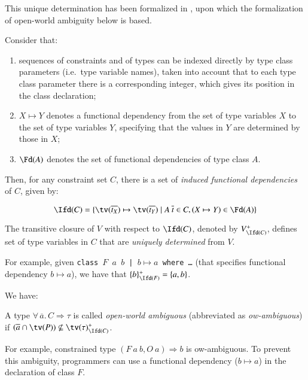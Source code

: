 \documentclass[review]{elsarticle}
\begin{document}
This unique determination has been formalized in
\cite{Type-classes-with-FDs-MarkJones00,MarkJonesIatchki2008-FDs},
upon which the formalization of open-world ambiguity below is based.

Consider that:

  \begin{enumerate}

    \item sequences of constraints and of types can be indexed
      directly by type class parameters (i.e.~type variable names),
      taken into account that to each type class parameter there is a
      corresponding integer, which gives its position in the class
      declaration;

    \item $X \mapsto Y$ denotes a functional dependency from the set
      of type variables $X$ to the set of type variables $Y$,
      specifying that the values in $Y$ are determined by those in
      $X$;

    \item $\Fd(A)$ denotes the set of functional dependencies of type
      class $A$.

  \end{enumerate}

Then, for any constraint set $C$, there is a set of {\em induced
  functional dependencies\/} of $C$, given by:

  \[ \Ifd(C) = \{ \tv(\overline{t_X}) \mapsto \tv(\overline{t_Y})
                  \mid A\:\overline{t} \in C, (X\mapsto Y) \in \Fd(A) \}
          \]

The transitive closure of $V$ with respect to $\Ifd(C)$, denoted by
$V_{\Ifd(C)}^+$, defines set of type variables in $C$ that are {\em
  uniquely determined\/} from $V$.

For example, given {\tt class $F$ $a$ $b$ | $b \mapsto a$ where
  \ldots} (that specifies functional dependency ${b} \mapsto {a}$),
we have that $\{ b \}_{\Ifd(F)}^+ = \{ a, b \}$.

We have:

\begin{Definition}
A type $\forall\,\overline{a}.\,C \Rightarrow \tau$ is called
{\em{open-world ambiguous\/}} (abbreviated as {\em ow-ambiguous\/})
if $(\overline{a} \cap \tv(P)) \not\subseteq \tv(\tau)_{\Ifd(C)}^+$.
\label{open-world-ambiguity-def}
 \end{Definition}

For example, constrained type $(F\:a\:b,O\: a) \Rightarrow b$ is
ow-ambiguous. To prevent this ambiguity, programmers can use a
functional dependency ($b \mapsto a$) in the declaration of class $F$.
\end{document}
